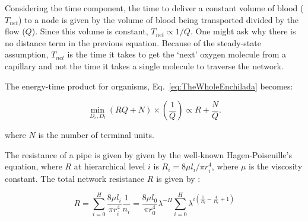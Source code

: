\documentclass[12pt]{article}
\begin{document}

Considering the time component, the time to deliver a constant volume of blood
($T_{net}$) to a node is given by the volume of blood being transported divided
by the flow ($Q$).  Since this volume is constant, $T_{net}\propto 1/Q$.  One
might ask why there is no distance term in the previous equation.  Because of
the steady-state assumption, $T_{net}$ is the time it takes to get the `next'
oxygen molecule from a capillary and not the time it takes a single molecule to
traverse the network.

The energy-time product for organisms, Eq.~\ref{eq:TheWholeEnchilada}
becomes:

\begin{equation}
  \min_{D_r,D_l} (RQ + N) \times (\frac{1}{Q}) \propto R +
 \frac{N}{Q}.
\label{eq:bio-min}
\end{equation}

\noindent where $N$ is the number of terminal units.  


The resistance of a pipe is given by given by the well-known Hagen-Poiseuille's
equation, where $R$ at hierarchical level $i$ is $R_i = 8\mu l_i/\pi r_i^4$,
where $\mu$ is the viscosity constant.  The total network resistance $R$ is
given by \cite{west97}:

\begin{equation}
\label{eq:resistance}
R = \sum_{i=0}^H \frac{8\mu l_i}{\pi r_i^4}\frac{1}{n_i}
= \frac{8\mu l_0}{\pi r_0^4} \lambda^{-H}\sum_{i=0}^H \lambda^{i 
\left(\frac{1}{D_l} - \frac{4}{D_r} + 1 \right)}
\end{equation}
\end{document}
